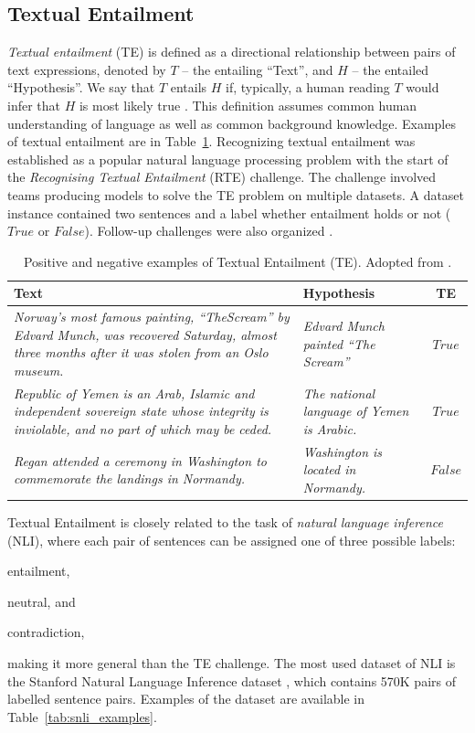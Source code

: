 \subsection{Textual Entailment}
\label{sec:textual_entailment}

\textit{Textual entailment} (TE) is defined as a directional relationship
between pairs of text expressions, denoted by $T$ -- the entailing ``Text'',
and $H$ -- the entailed ``Hypothesis''. We say that $T$ entails $H$ if,
typically, a human reading $T$ would infer that $H$ is most likely true 
\citep{dagan2005pascal}.  This definition assumes common human understanding of
language as well as common background knowledge. Examples of textual entailment
are in
Table~\ref{tab:te_examples}.  
Recognizing textual entailment was established as
a popular natural language processing problem with the start of the
\textit{Recognising Textual Entailment} (RTE) challenge. The challenge involved
teams producing models to solve the TE problem on multiple datasets. A dataset
instance contained two sentences and a label whether entailment holds or not
($\mathit{True}$ or $\mathit{False}$).
Follow-up challenges were also organized \citep{bar2006second, giampiccolo2007third}.

\begin{table}
	\centering
	\begin{tabular}{p{8cm} | p{5cm} | c}
		Text & Hypothesis & TE \\
		\toprule
		\textit{
		Norway’s most famous painting, ``TheScream'' by Edvard Munch, was recovered
		Saturday, almost three months after it was stolen from an Oslo
		museum.} & 
		\textit{Edvard   Munch   painted ``The Scream''  }
		& $\mathit{True}$ \\
		\textit{Republic of Yemen is an Arab, Islamic and independent
		sovereign state whose integrity is inviolable,  and  no part
		of which may be ceded.} & 
		\textit{The national language of Yemen is Arabic.}
		& $\mathit{True}$ \\
		\textit{Regan attended a ceremony in Washington to commemorate the
		landings in Normandy.} &
		\textit{Washington is located in Normandy. } & $\mathit{False}$ \\
		\bottomrule
	\end{tabular}
	\caption{Positive and negative examples of Textual Entailment (TE).
	Adopted from \citep{dagan2005pascal}.}
	\label{tab:te_examples}
\end{table}

Textual Entailment is closely related to the task of \textit{natural language inference} (NLI), 
where each pair of sentences can be assigned one of three possible labels:
\begin{enumerate*}
	\item entailment, 
	\item neutral, and
	\item contradiction,
\end{enumerate*} 
making it more general than the TE challenge. 
The most used dataset of NLI is the Stanford Natural Language Inference dataset
\citep{bowman2015large}, which contains 570K pairs of labelled sentence pairs. 
Examples of the dataset are available in Table~\ref{tab:snli_examples}.

